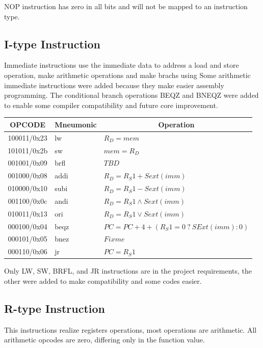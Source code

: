 \documentclass{article}
\begin{document}
NOP instruction has zero in all bits and will not be mapped to an instruction type.
  
  \subsection{I-type Instruction}
  Immediate instructions use the immediate data to address a load and store operation, make arithmetic operations and make brachs using 
Some arithmetic immediate instructions were added because they make easier assembly programming. The conditional branch operations BEQZ and BNEQZ were added to enable some compiler compatibility and future core improvement.

  \FloatBarrier
  \begin{table}[H]
    \begin{center}
      \begin{tabular}[pos]{| c | l | l |} \hline 	
      \multicolumn{1}{|c|}{\cellcolor[gray]{0.9}\textbf{OPCODE}} & 
      \multicolumn{1}{c|}{\cellcolor[gray]{0.9}\textbf{Mneumonic}} & 
      \multicolumn{1}{c|}{\cellcolor[gray]{0.9}\textbf{Operation}} \\ \hline
	 100011/0x23 	& lw & $R_D = mem$ \\ \hline
	 101011/0x2b 	& sw & $mem = R_D$ \\ \hline
	 001001/0x09 	& brfl & $TBD$ \\ \hline
	 001000/0x08 & addi & $R_D = R_S1 + Sext(imm)$ \\ \hline
	 010000/0x10 & subi & $R_D = R_S1 - Sext(imm)$ \\ \hline
	 001100/0x0c & andi & $R_D = R_S1 \land Sext(imm)$ \\ \hline
	 010011/0x13 & ori & $R_D = R_S1 \lor Sext(imm)$ \\ \hline
	 000100/0x04 & beqz & $PC = PC + 4 +(R_S1 = 0~?~SExt(imm): 0)$ \\ \hline
	 000101/0x05 & bnez & $Fixme$ \\ \hline
	 000110/0x06 & jr & $PC = R_S1$ \\ \hline
      \end{tabular}
    \end{center}
  \end{table} 

Only LW, SW, BRFL, and JR instructions are in the project requirements, the other were added to make compatibility and some codes easier.
  
  \subsection{R-type Instruction}
This instructions realize registers operations, most operations are arithmetic. All arithmetic opcodes are zero, differing only in the function value.
\end{document}
